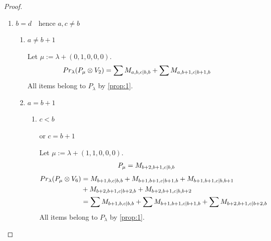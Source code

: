 \begin{proof}
\begin{enumerate}
    \item $b = d\quad \text{hence } a,c \neq b$
      \begin{enumerate}
        \item $ a \neq b+1 $ \par
        Let $\mu:=\lambda + (0,1,0,0,0) $.
        \begin{equation}\notag
          \begin{aligned}
            Pr_{\lambda}(P_\mu \otimes V_{2}) &=
\sum M_{a,b,c|b,b}
+\sum M_{a,b+1,c|b+1,b}
          \end{aligned}
        \end{equation}
All items belong to $P_\lambda$ by \cref{prop:1}.

        \item $a = b+1 $ 
          \begin{enumerate}
            \item $ c < b $ \par
              $\text{or } c = b+1 $ \par
        Let $\mu:=\lambda + (1,1,0,0,0) $.
        \begin{equation}\notag
          \begin{aligned}
            P_\mu = M_{b+2,b+1,c|b,b}
          \end{aligned}
        \end{equation}
        \begin{equation}\notag
          \begin{aligned}
            Pr_{\lambda}(P_\mu \otimes V_{6}) &=
M_{b+1,b,c|b,b}
+ M_{b+1,b+1,c|b+1,b}
+ M_{b+1,b+1,c|b,b+1}\\
                                               &
+ M_{b+2,b+1,c|b+2,b}
+ M_{b+2,b+1,c|b,b+2} \\
                                               &=
 \sum M_{b+1,b,c|b,b}
+ \sum M_{b+1,b+1,c|b+1,b}
+ \sum M_{b+2,b+1,c|b+2,b}
          \end{aligned}
        \end{equation}
All items belong to $P_\lambda$ by \cref{prop:1}.


\end{enumerate}
\end{enumerate}
\end{enumerate}
\end{proof}
